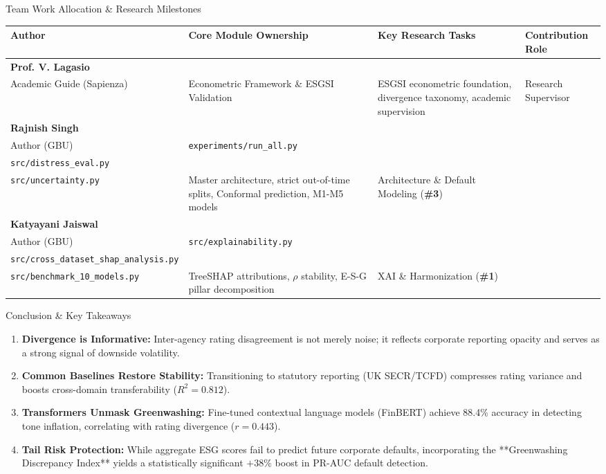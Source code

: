 \documentclass[aspectratio=169,10pt]{beamer}
\begin{document}
\begin{frame}[t]{Team Work Allocation \& Research Milestones}
\small
\begin{tabular}{@{}p{2.6cm}p{3.3cm}p{4.2cm}p{2.7cm}@{}}
\toprule
\textbf{Author} & \textbf{Core Module Ownership} & \textbf{Key Research Tasks} & \textbf{Contribution Role} \\
\midrule
\textbf{Prof. V. Lagasio}\\ {\scriptsize Academic Guide (Sapienza)} & Econometric Framework \& ESGSI Validation & ESGSI econometric foundation, divergence taxonomy, academic supervision & Research Supervisor\\
\addlinespace
\textbf{Rajnish Singh}\\ {\scriptsize Author (GBU)} & \texttt{experiments/run\_all.py}\\\texttt{src/distress\_eval.py}\\\texttt{src/uncertainty.py} & Master architecture, strict out-of-time splits, Conformal prediction, M1-M5 models & Architecture \& Default Modeling (\textbf{\#3})\\
\addlinespace
\textbf{Katyayani Jaiswal}\\ {\scriptsize Author (GBU)} & \texttt{src/explainability.py}\\\texttt{src/cross\_dataset\_shap\_analysis.py}\\\texttt{src/benchmark\_10\_models.py} & TreeSHAP attributions, $\rho$ stability, E-S-G pillar decomposition & XAI \& Harmonization (\textbf{\#1})\\
\bottomrule
\end{tabular}
\end{frame}

\begin{frame}[t]{Conclusion & Key Takeaways}
\small
\begin{enumerate}\setlength{\itemsep}{4pt}
  \item \textbf{Divergence is Informative:} Inter-agency rating disagreement is not merely noise; it reflects corporate reporting opacity and serves as a strong signal of downside volatility.
  \item \textbf{Common Baselines Restore Stability:} Transitioning to statutory reporting (UK SECR/TCFD) compresses rating variance and boosts cross-domain transferability ($R^2 = 0.812$).
  \item \textbf{Transformers Unmask Greenwashing:} Fine-tuned contextual language models (FinBERT) achieve 88.4\% accuracy in detecting tone inflation, correlating with rating divergence ($r = 0.443$).
  \item \textbf{Tail Risk Protection:} While aggregate ESG scores fail to predict future corporate defaults, incorporating the **Greenwashing Discrepancy Index** yields a statistically significant $+38\%$ boost in PR-AUC default detection.
\end{enumerate}
\end{frame}
\end{document}
